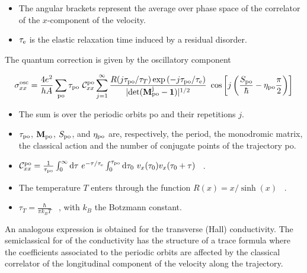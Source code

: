 \documentclass[a4paper,10pt]{article}
\newcommand{\dif}{\mathrm{d}}
\newcommand{\nin}{\noindent}
\newcommand{\be}{\begin{equation}}
\newcommand{\ee}{\end{equation}}
\begin{document}
\begin{itemize}

\item The angular brackets represent the average over phase space of the correlator of the $x$-component of the velocity.

\item $\tau_{\rm e}$ is the elastic relaxation time induced by a residual disorder. 

\end{itemize}

\nin The quantum correction is given by the oscillatory 
component \cite{Greg,KlausEPL}

\be
\sigma_{xx}^{\rm osc} = \frac{4e^2}{hA} 
\sum_{\rm po} \tau_{\rm po} \ {\cal C}_{xx}^{\rm po}
\sum_{j=1}^{\infty} \frac{R(j\tau_{\rm po}/\tau_{T})
\exp{(-j\tau_{\rm po}/\tau_{\rm e})}}
{|{\rm det({\bf M}_{\rm po}^{j}-{\bf 1})}|^{1/2}} \
\cos{\left[j\left(\frac{S_{\rm po}}{\hbar} - \eta_{\rm po} \frac{\pi}{2}\right)\right]}
\label{eq:conductivity_osc}
\ee

\begin{itemize}

\item The sum is over the periodic orbits po and their repetitions $j$.

\item $\tau_{\rm po}$, ${\bf M}_{\rm po}$, $S_{\rm po}$, and $\eta_{\rm po}$ are, respectively, the period, the monodromic matrix, the classical action and the number of conjugate points of the trajectory po.  

\item ${\cal C}_{xx}^{\rm po} = \frac{1}{\tau_{\rm po}} 
\int_{0}^{\infty} \dif \tau \ e^{-\tau/\tau_{\rm e}} 
\int_{0}^{\tau_{\rm po}} \dif \tau_0 \ v_{x}(\tau_0)v_{x}(\tau_0+\tau)$ \ .

\item The temperature $T$ enters through the function $R(x) = x/\sinh{(x)}$ \ .

\item $\tau_T=\frac{\hbar}{\pi k_B T}$ \ , with $k_B$ the Botzmann constant. 

\end{itemize}

\nin An analogous expression is obtained for the transverse (Hall) conductivity. The semiclassical for of the conductivity has the structure of a trace formula where the coefficients associated to the periodic orbits are affected by the classical correlator of the longitudinal component of the velocity along the trajectory. 
\end{document}
